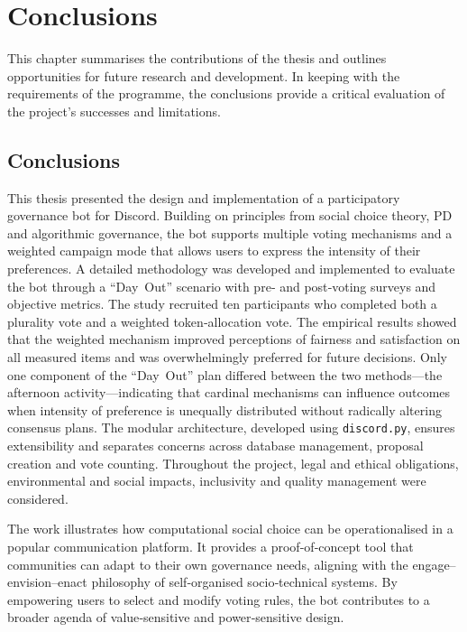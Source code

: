 \doublespacing %

\chapter{Conclusions}
\label{ch:conclusions}

This chapter summarises the contributions of the thesis and outlines
opportunities for future research and development.  In keeping with the
requirements of the programme, the conclusions provide a critical
evaluation of the project’s successes and limitations.

\section*{Conclusions}

This thesis presented the design and implementation of a participatory
governance bot for Discord.  Building on principles from social choice
theory, PD and algorithmic governance, the bot supports
multiple voting mechanisms and a weighted campaign mode that allows users
to express the intensity of their preferences.  A detailed methodology
was developed and implemented to evaluate the bot through a ``Day~Out'' scenario
with pre‑ and post‑voting surveys and objective metrics.  The study recruited
ten participants who completed both a plurality vote and a weighted
token‑allocation vote.  The empirical results showed that the weighted mechanism
improved perceptions of fairness and satisfaction on all measured items and was
overwhelmingly preferred for future decisions.  Only one component of the
``Day~Out'' plan differed between the two methods—the afternoon activity—indicating
that cardinal mechanisms can influence outcomes when intensity of preference is
unequally distributed without radically altering consensus plans.  The modular
architecture, developed using \texttt{discord.py}, ensures extensibility
and separates concerns across database management, proposal creation and
vote counting.  Throughout the project, legal and ethical obligations,
environmental and social impacts, inclusivity and quality management were
considered.

The work illustrates how computational social choice can be operationalised
in a popular communication platform.  It provides a proof‑of‑concept tool
that communities can adapt to their own governance needs, aligning with
the engage–envision–enact philosophy of self‑organised socio‑technical
systems.  By empowering users to select and modify voting rules, the bot
contributes to a broader agenda of value‑sensitive and power‑sensitive
design.

